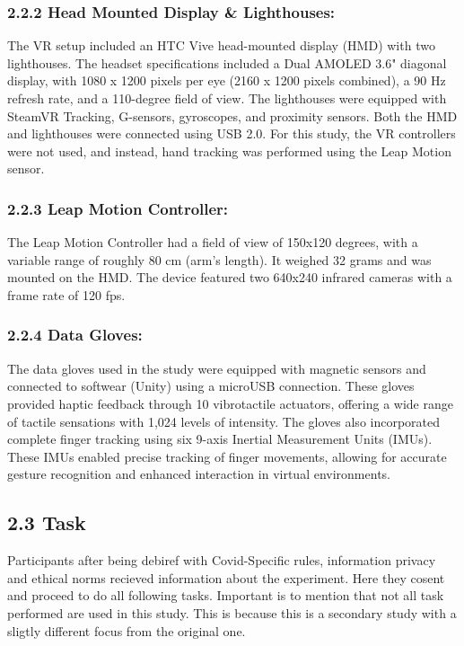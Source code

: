\documentclass[12pt,oneside,openright]{report}
\begin{document}
\subsubsection*{2.2.2 Head Mounted Display \& Lighthouses:}
The VR setup included an HTC Vive head-mounted display (HMD) with two lighthouses. The headset specifications included a Dual AMOLED 3.6" diagonal display, with 1080 x 1200 pixels per eye (2160 x 1200 pixels combined), a 90 Hz refresh rate, and a 110-degree field of view. The lighthouses were equipped with SteamVR Tracking, G-sensors, gyroscopes, and proximity sensors. Both the HMD and lighthouses were connected using USB 2.0. For this study, the VR controllers were not used, and instead, hand tracking was performed using the Leap Motion sensor.

\subsubsection*{2.2.3 Leap Motion Controller:}
The Leap Motion Controller had a field of view of 150x120 degrees, with a variable range of roughly 80 cm (arm's length). It weighed 32 grams and was mounted on the HMD. The device featured two 640x240 infrared cameras with a frame rate of 120 fps.

\subsubsection*{2.2.4 Data Gloves:}
The data gloves used in the study were equipped with magnetic sensors and connected to softwear (Unity) using a microUSB connection. These gloves provided haptic feedback through 10 vibrotactile actuators, offering a wide range of tactile sensations with 1,024 levels of intensity. The gloves also incorporated complete finger tracking using six 9-axis Inertial Measurement Units (IMUs). These IMUs enabled precise tracking of finger movements, allowing for accurate gesture recognition and enhanced interaction in virtual environments.


\subsection*{2.3 Task}

Participants after being debiref with Covid-Specific rules, information privacy and ethical norms recieved information about the experiment. Here they cosent and proceed to do all following tasks. Important is to mention that not all task performed are used in this study. This is because this is a secondary study with a sligtly different focus from the original one. 
\end{document}
